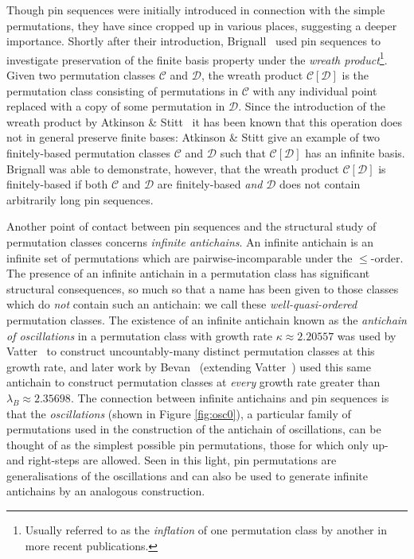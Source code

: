 \documentclass[11pt,a4paper]{article}
\theoremstyle{definition}
\begin{document}
Though pin sequences were initially introduced in connection with the simple permutations, they have since cropped up in various places, suggesting a deeper importance. Shortly after their introduction, Brignall~\cite{brignall:wreath-products:} used pin sequences to investigate preservation of the finite basis property under the \emph{wreath product}\footnote{Usually referred to as the \emph{inflation} of one permutation class by another in more recent publications.}. Given two permutation classes $\mathcal{C}$ and $\mathcal{D}$, the wreath product $\mathcal{C}[\mathcal{D}]$ is the permutation class consisting of permutations in $\mathcal{C}$ with any individual point replaced with a copy of some permutation in $\mathcal{D}$. Since the introduction of the wreath product by Atkinson \& Stitt~\cite{atkinson:restricted-perm:a} it has been known that this operation does not in general preserve finite bases: Atkinson \& Stitt give an example of two finitely-based permutation classes $\mathcal{C}$ and $\mathcal{D}$ such that $\mathcal{C}[\mathcal{D}]$ has an infinite basis. Brignall was able to demonstrate, however, that the wreath product $\mathcal{C}[\mathcal{D}]$ is finitely-based if both $\mathcal{C}$ and $\mathcal{D}$ are finitely-based \emph{and} $\mathcal{D}$ does not contain arbitrarily long pin sequences.

Another point of contact between pin sequences and the structural study of permutation classes concerns \emph{infinite antichains}. An infinite antichain is an infinite set of permutations which are pairwise-incomparable under the $\leq$-order. The presence of an infinite antichain in a permutation class has significant structural consequences, so much so that a name has been given to those classes which do \emph{not} contain such an antichain: we call these \emph{well-quasi-ordered} permutation classes. The existence of an infinite antichain known as the \emph{antichain of oscillations} in a permutation class with growth rate $\kappa \approx 2.20557$ was used by Vatter~\cite{vatter:small-permutati:} to construct uncountably-many distinct permutation classes at this growth rate, and later work by Bevan~\cite{bevan:intervals} (extending Vatter~\cite{vatter:every-growth-rate:}) used this same antichain to construct permutation classes at \emph{every} growth rate greater than $\lambda_{B} \approx 2.35698$. The connection between infinite antichains and pin sequences is that the \emph{oscillations} (shown in Figure \ref{fig:osc0}), a particular family of permutations used in the construction of the antichain of oscillations, can be thought of as the simplest possible pin permutations, those for which only up- and right-steps are allowed. Seen in this light, pin permutations are generalisations of the oscillations and can also be used to generate infinite antichains by an analogous construction.
\end{document}
